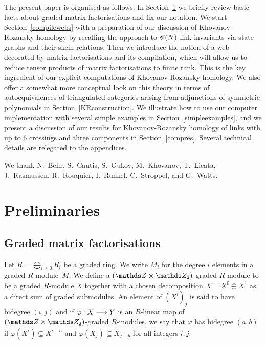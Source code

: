 \documentclass{compositio}
\theoremstyle{definition}
\numberwithin{equation}{section}
\begin{document}
\medskip

The present paper is organised as follows. In Section~\ref{preliminaries} we briefly review basic facts about graded matrix factorisations and fix our notation. We start Section~\ref{compilewebs} with a preparation of our discussion of Khovanov-Rozansky homology by recalling the approach to $\mathfrak{sl}(N)$ link invariants via state graphs and their skein relations. Then we introduce the notion of a web decorated by matrix factorisations and its compilation, which will allow us to reduce tensor products of matrix factorisations to finite rank. This is the key ingredient of our explicit computations of Khovanov-Rozansky homology. We also offer a somewhat more conceptual look on this theory in terms of autoequivalences of triangulated categories arising from adjunctions of symmetric polynomials in Section~\ref{KRconstruction}. We illustrate how to use our computer implementation with several simple examples in Section~\ref{simpleexamples}, and we present a discussion of our results for Khovanov-Rozansky homology of links with up to 6 crossings and three components in Section~\ref{compres}. Several technical details are relegated to the appendices. 


\begin{acknowledgements}
We thank N.~Behr, S.~Cautis, S.~Gukov, M.~Khovanov, T.~Licata, J.~Rasmussen, R.~Rouquier, I.~Runkel, C.~Stroppel, and G.~Watts. 
\end{acknowledgements}


\section{Preliminaries}
\label{preliminaries}

\subsection{Graded matrix factorisations}

Let $R = \bigoplus_{i \ge 0} R_i$ be a graded ring. We write $M_i$ for the degree $i$ elements in a graded $R$-module~$M$. We define a $(\ZZ \times \Ztwo)$-graded $R$-module to be a graded $R$-module $X$ together with a chosen decomposition $X = X^0 \oplus X^1$ as a direct sum of graded submodules. An element of $(X^i)_j$ is said to have bidegree $(i,j)$ and if $\varphi: X \longrightarrow Y$ is an $R$-linear map of $(\ZZ \times \Ztwo)$-graded $R$-modules, we say that $\varphi$ has bidegree $(a,b)$ if $\varphi(X^i) \subseteq X^{i+a}$ and $\varphi(X_j) \subseteq X_{j+b}$ for all integers $i,j$.
\end{document}

